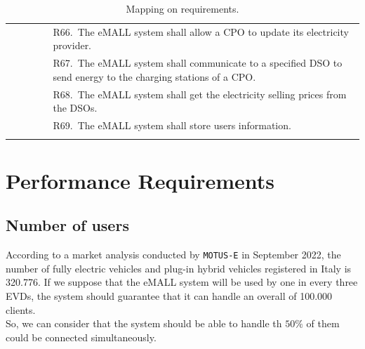 \begin{center}
\begin{longtable}{p{0.12\linewidth}p{0.88\linewidth}}
        & R66.\ The eMALL system shall allow a CPO to update its electricity provider.                                                                    \\
        & R67.\ The eMALL system shall communicate to a specified DSO to send energy to the charging stations of a CPO\@.                                 \\
        & R68.\ The eMALL system shall get the electricity selling prices from the DSOs.                                                                  \\
        & R69.\ The eMALL system shall store users information.                                                                                           \\
        \hline
        \caption{Mapping on requirements.}
        \label{tab: map_on_req}
    \end{longtable}
\end{center}


\section{Performance Requirements}
\label{sec:performance_requirements}%
\subsection*{Number of users}
According to a market analysis conducted by \verb|MOTUS-E| in September 2022,
the number of fully electric vehicles and plug-in hybrid vehicles registered in Italy is 320.776.
If we suppose that the eMALL system will be used by one in every three EVDs,
the system should guarantee that it can handle an overall of 100.000 clients. \\
So, we can consider that the system should be able to handle th $50\%$ of them could be connected simultaneously.

